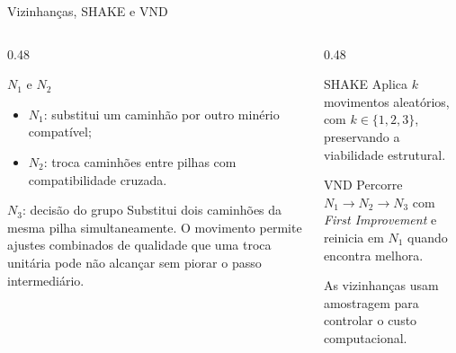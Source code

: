\documentclass[aspectratio=169]{beamer}
\begin{document}
\begin{frame}{Vizinhanças, SHAKE e VND}
\begin{columns}[T]
    \begin{column}{0.48\textwidth}
        \begin{block}{$N_1$ e $N_2$}
            \begin{itemize}
                \item $N_1$: substitui um caminhão por outro minério compatível;
                \item $N_2$: troca caminhões entre pilhas com compatibilidade cruzada.
            \end{itemize}
        \end{block}

        \begin{alertblock}{$N_3$: decisão do grupo}
            Substitui dois caminhões da mesma pilha simultaneamente. O movimento
            permite ajustes combinados de qualidade que uma troca unitária pode
            não alcançar sem piorar o passo intermediário.
        \end{alertblock}
    \end{column}

    \begin{column}{0.48\textwidth}
        \begin{exampleblock}{SHAKE}
            Aplica $k$ movimentos aleatórios, com $k \in \{1,2,3\}$, preservando
            a viabilidade estrutural.
        \end{exampleblock}

        \begin{exampleblock}{VND}
            Percorre $N_1 \to N_2 \to N_3$ com \textit{First Improvement} e
            reinicia em $N_1$ quando encontra melhora.
        \end{exampleblock}

        As vizinhanças usam amostragem para controlar o custo computacional.
    \end{column}
\end{columns}
\end{frame}
\end{document}
